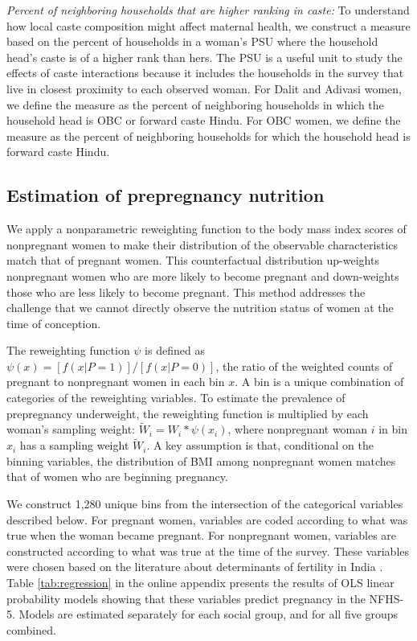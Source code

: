 \documentclass[12pt]{article}
\begin{document}
\textit{Percent of neighboring households that are higher ranking in caste: }To understand how local caste composition might affect maternal health, we construct a measure based on the percent of households in a woman's PSU where the household head's caste is of a higher rank than hers. The PSU is a useful unit to study the effects of caste interactions because it includes the households in the survey that live in closest proximity to each observed woman. For Dalit and Adivasi women, we define the measure as the percent of neighboring households in which the household head is OBC or forward caste Hindu. For OBC women, we define the measure as the percent of neighboring households for which the household head is forward caste Hindu. 

 
\subsection{Estimation of prepregnancy nutrition}

We apply a nonparametric reweighting function to the body mass index scores of nonpregnant women to make their distribution of the observable characteristics match that of pregnant women. This counterfactual distribution up-weights nonpregnant women who are more likely to become pregnant and down-weights those who are less likely to become pregnant. This method addresses the challenge that we cannot directly observe the nutrition status of women at the time of conception. 
 
The reweighting function \(\psi\) is defined as \(\psi(x)=[f(x|P=1)]/[f(x|P=0)]\), the ratio of the weighted counts of pregnant to nonpregnant women in each bin \(x\).  A bin is a unique combination of categories of the reweighting variables. To estimate the prevalence of prepregnancy underweight, the reweighting function is multiplied by each woman's sampling weight: \(\tilde{W}_i = W_i * \psi(x_i)\), where nonpregnant woman \(i\) in bin \(x_i\) has a sampling weight \(\tilde{W}_i\). A key assumption is that, conditional on the binning variables, the distribution of BMI among nonpregnant women matches that of women who are beginning pregnancy.

We construct 1,280 unique bins from the intersection of the categorical variables described below.  For pregnant women, variables are coded according to what was true when the woman became pregnant.  For nonpregnant women, variables are constructed according to what was true at the time of the survey.  These variables were chosen based on the literature about determinants of fertility in India \citep{jha2025effects, singh2022key, dharmalingam2014determinants}.  Table \ref{tab:regression} in the online appendix presents the results of OLS linear probability models showing that these variables predict pregnancy in the NFHS-5.  Models are estimated separately for each social group, and for all five groups combined. 
\end{document}
